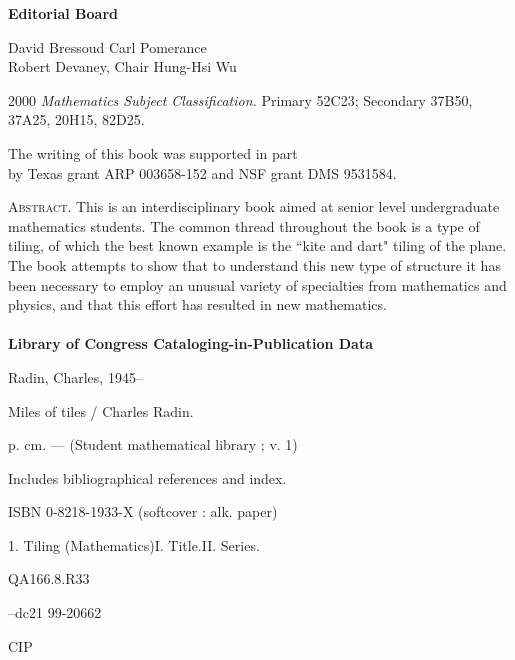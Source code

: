 \begin{copyrightpage}
\begin{center}
\textbf{Editorial Board}
\end{center}

\begin{center}
David Bressoud \hfill Carl Pomerance\\
Robert Devaney, Chair \hfill Hung-Hsi Wu\\
\end{center}

\begin{center}
2000 \emph{Mathematics Subject Classification.} Primary 52C23;
Secondary 37B50, 37A25, 20H15, 82D25.
\end{center}

\begin{center}
The writing of this book was supported in part\\
by Texas grant ARP 003658-152 and NSF grant DMS 9531584.
\end{center}


\noindent \textsc{Abstract}. This is an interdisciplinary book aimed at senior level undergraduate mathematics students. The common thread throughout the book is a type of tiling, of which the best known example is the ``kite and dart" tiling of the plane. The book attempts to show that to understand this new type of structure it has been necessary to employ an unusual variety of specialties from mathematics and physics, and that this effort has resulted in new mathematics.\\

\hrulefill\\

\noindent \textbf{Library of Congress Cataloging-in-Publication
Data}

\noindent Radin, Charles, 1945--

Miles of tiles / Charles Radin.

\quad p. \quad cm. --- (Student mathematical library ; v. 1)

Includes bibliographical references and index.

ISBN 0-8218-1933-X (softcover : alk. paper)

1. Tiling (Mathematics)\quad I. Title.\quad II. Series.

\noindent QA166.8.R33 

--dc21 \hfill 99-20662

\hfill CIP\\


\end{copyrightpage}
